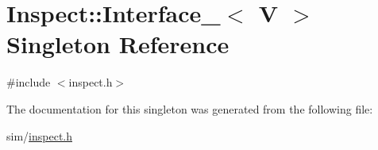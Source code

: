 \hypertarget{singleton_inspect_1_1_interface__}{\section{Inspect\+:\+:Interface\+\_\+$<$ V $>$ Singleton Reference}
\label{singleton_inspect_1_1_interface__}
}


{\ttfamily \#include $<$inspect.\+h$>$}



The documentation for this singleton was generated from the following file\+:\begin{DoxyCompactItemize}
\item 
sim/\hyperlink{inspect_8h}{inspect.\+h}\end{DoxyCompactItemize}
